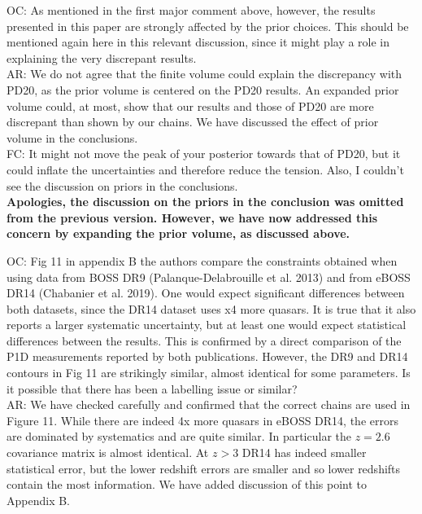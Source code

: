 \documentclass[12pt]{article}
\begin{document}
OC: As mentioned in the first major comment above, however, the results presented in this paper are strongly affected by the prior choices. This should be mentioned again here in this relevant discussion, since it might play a role in explaining the very discrepant results.\\

AR: We do not agree that the finite volume could explain the discrepancy with PD20, as the prior volume is centered on the PD20 results. An expanded prior volume could, at most, show that our results and those of PD20 are more discrepant than shown by our chains. We have discussed the effect of prior volume in the conclusions.\\

FC: It might not move the peak of your posterior towards that of PD20, but it could inflate the uncertainties and therefore reduce the tension. Also, I couldn’t see the discussion on priors in the conclusions.\\

\textbf{Apologies, the discussion on the priors in the conclusion was omitted from the previous version. However, we have now addressed this concern by expanding the prior volume, as discussed above.}\\

\hrulefill \newline

OC: Fig 11 in appendix B the authors compare the constraints obtained when using data from BOSS DR9 (Palanque-Delabrouille et al. 2013) and from eBOSS DR14 (Chabanier et al. 2019). One would expect significant differences between both datasets, since the DR14 dataset uses x4 more quasars. It is true that it also reports a larger systematic uncertainty, but at least one would expect statistical differences between the results. This is confirmed by a direct comparison of the P1D measurements reported by both publications. However, the DR9 and DR14 contours in Fig 11 are strikingly similar, almost identical for some parameters. Is it possible that there has been a labelling issue or similar?\\

AR: We have checked carefully and confirmed that the correct chains are used in Figure 11. While there are indeed 4x more quasars in eBOSS DR14, the errors are dominated by systematics and are quite similar. In particular the $z=2.6$ covariance matrix is almost identical. At $z > 3$ DR14 has indeed smaller statistical error, but the lower redshift errors are smaller and so lower redshifts contain the most information. We have added discussion of this point to Appendix B.
\end{document}
